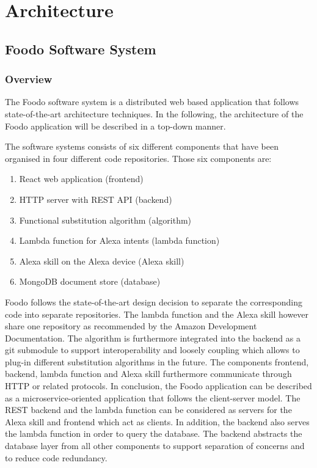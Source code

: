 \chapter{Architecture}
\section{Foodo Software System}
\subsection{Overview}
The Foodo software system is a distributed web based application that follows state-of-the-art architecture techniques. In the following, the architecture of the Foodo application will be described in a top-down manner.
 
The software systems consists of six different components that have been organised in four different code repositories. Those six components are:
\begin{enumerate}
	\itemsep-0.5em 
	\item React web application (frontend)
	\item HTTP server with REST API (backend)
	\item Functional substitution algorithm (algorithm)
	\item Lambda function for Alexa intents (lambda function)
	\item Alexa skill on the Alexa device (Alexa skill)
	\item MongoDB document store (database)
\end{enumerate}

Foodo follows the state-of-the-art design decision to separate the corresponding code into separate repositories. The lambda function and the Alexa skill however share one repository as recommended by the Amazon Development Documentation. The algorithm is furthermore integrated into the backend as a git submodule to support interoperability and loosely coupling which allows to plug-in different substitution algorithms in the future. The components frontend, backend, lambda function and Alexa skill furthermore communicate through HTTP or related protocols. In conclusion, the Foodo application can be described as a microservice-oriented application that follows the client-server model. The REST backend and the lambda function can be considered as servers for the Alexa skill and frontend which act as clients. In addition, the backend also serves the lambda function in order to query the database. The backend abstracts the database layer from all other components to support separation of concerns and to reduce code redundancy. 

